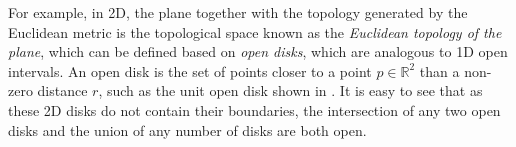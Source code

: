 For example, in 2D, the plane together with the topology generated by the Euclidean metric is the topological space known as the \emph{Euclidean topology of the plane}, which can be defined based on \emph{open disks}, which are analogous to 1D open intervals.
An open disk is the set of points closer to a point $p \in \mathbb{R}^2$ than a non-zero distance $r$, such as the unit open disk shown in .
It is easy to see that as these 2D disks do not contain their boundaries, the intersection of any two open disks and the union of any number of disks are both open.

